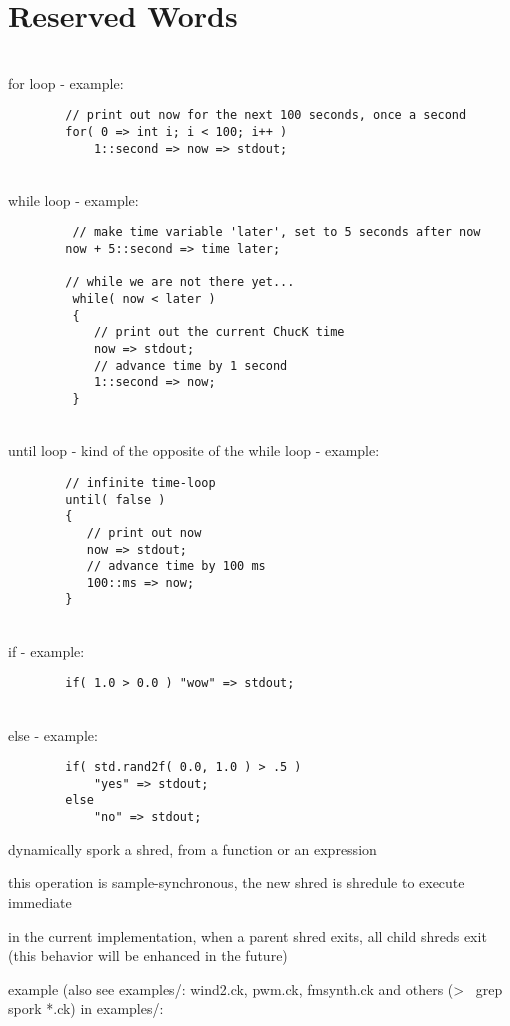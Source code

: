 \chapter{Reserved Words}


\\
for loop - example:

\begin{verbatim}
        // print out now for the next 100 seconds, once a second
        for( 0 => int i; i < 100; i++ )
            1::second => now => stdout;
\end{verbatim}

\\
while loop - example:
\begin{verbatim}
         // make time variable 'later', set to 5 seconds after now
        now + 5::second => time later;
   
        // while we are not there yet...
         while( now < later )
         {
            // print out the current ChucK time
            now => stdout;
            // advance time by 1 second
            1::second => now;
         }
\end{verbatim}

\\
until loop - kind of the opposite of the while loop - example:
\begin{verbatim}
        // infinite time-loop
        until( false )
        {
           // print out now
           now => stdout;
           // advance time by 100 ms
           100::ms => now;
        }
\end{verbatim}

\\
if - example:
\begin{verbatim}
        if( 1.0 > 0.0 ) "wow" => stdout;
\end{verbatim}

\\
else - example:
\begin{verbatim}
        if( std.rand2f( 0.0, 1.0 ) > .5 )
            "yes" => stdout;
        else
            "no" => stdout;
\end{verbatim}

\begin{chuckitemize}
\item dynamically spork a shred, from a function or an expression
\item this operation is sample-synchronous, the new shred is shredule to execute immediate
\item in the current implementation, when a parent shred exits, all child shreds exit (this behavior will be enhanced in the future)
\item example (also see examples/: wind2.ck, pwm.ck, fmsynth.ck and others (\textgreater~ grep spork *.ck) in examples/:
\end{chuckitemize}

